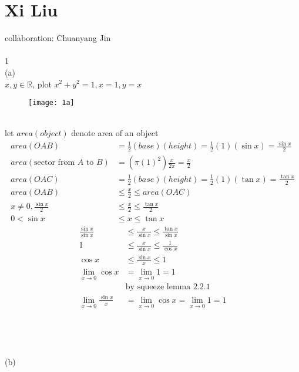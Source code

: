\documentclass[12pt, border = 4pt, multi]{article} %
\begin{document}
\section*{Xi Liu}
collaboration: Chuanyang Jin\\
\\
1\\
(a)\\
$x, y \in \mathbb{R}$, plot $x ^ 2 + y ^ 2 = 1, x = 1, y = x$\\
\begin{figure}[h!]
	\centering
	\texttt{[image: 1a]}
\end{figure}\\
let $area(object)$ denote area of an object\\
\begin{align*}
area(OAB) &= \frac{1}{2}(base)(height) = \frac{1}{2}(1)(\sin x) = \frac{\sin x}{2}\\
area(\text{sector from } A \text{ to } B) &= (\pi(1) ^ 2)\frac{x}{2\pi} = \frac{x}{2}\\
area(OAC) &= \frac{1}{2}(base)(height) = \frac{1}{2}(1)(\tan x) = \frac{\tan x}{2}\\
area(OAB) &\leq \frac{x}{2} \leq area(OAC)\\
x \not= 0, \frac{\sin x}{2} &\leq \frac{x}{2} \leq \frac{\tan x}{2}\\
0 < \sin x &\leq x \leq \tan x
\end{align*}
\begin{align*}
\frac{\sin x}{\sin x} &\leq \frac{x}{\sin x} \leq \frac{\tan x}{\sin x}\\
1 &\leq \frac{x}{\sin x} \leq \frac{1}{\cos x}\\
\cos x &\leq \frac{\sin x}{x} \leq 1\\
\lim_{x \rightarrow 0} \cos x &= \lim_{x \rightarrow 0} 1 = 1\\
&\text{by squeeze lemma 2.2.1}\\
\lim_{x \rightarrow 0} \frac{\sin x}{x} &= \lim_{x \rightarrow 0} \cos x = \lim_{x \rightarrow 0} 1 = 1
\end{align*}
\\
\\
\\
\\
(b)
\end{document}

